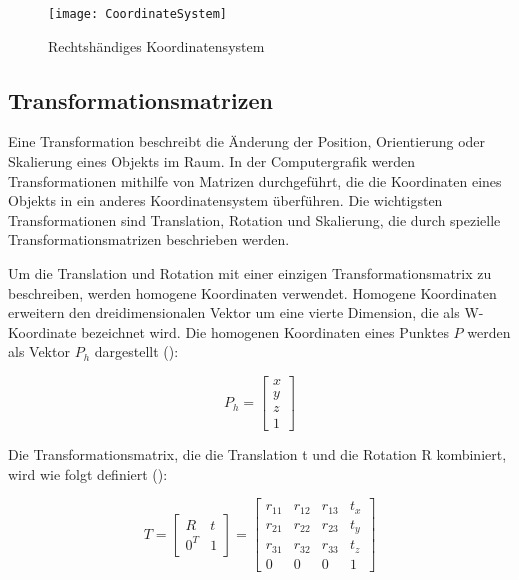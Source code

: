 \begin{figure}
    \centering
    \texttt{[image: CoordinateSystem]}
    \caption{Rechtshändiges Koordinatensystem \cite{appledevdoc}\label{fig:Koordinatensystem}}\par
\end{figure}

\subsection{Transformationsmatrizen}

Eine Transformation beschreibt die Änderung der Position, Orientierung oder Skalierung eines Objekts im Raum. In der Computergrafik werden Transformationen mithilfe von Matrizen durchgeführt, die die Koordinaten eines Objekts in ein anderes Koordinatensystem überführen. Die wichtigsten Transformationen sind Translation, Rotation und Skalierung, die durch spezielle Transformationsmatrizen beschrieben werden. \cite{doerner2022virtual, gao2021vSLAM, pezzi2021matrices}

Um die Translation und Rotation mit einer einzigen Transformationsmatrix zu beschreiben, werden homogene Koordinaten verwendet. Homogene Koordinaten erweitern den dreidimensionalen Vektor um eine vierte Dimension, die als W-Koordinate bezeichnet wird. Die homogenen Koordinaten eines Punktes \(P\) werden als Vektor \(P_h\) dargestellt (\cite{doerner2022virtual, gao2021vSLAM, freescale2010math3d}):

\begin{equation}
P_h = \begin{bmatrix} x \\ y \\ z \\ 1 \end{bmatrix}
\end{equation}

Die Transformationsmatrix, die die Translation t und die Rotation R kombiniert, wird wie folgt definiert (\cite{doerner2022virtual, gao2021vSLAM, freescale2010math3d}):

\begin{equation}
T = \begin{bmatrix} R & t \\ 0^T & 1 \end{bmatrix} = 
\begin{bmatrix} 
    r_{11} & r_{12} & r_{13} & t_x \\ 
    r_{21} & r_{22} & r_{23} & t_y \\ 
    r_{31} & r_{32} & r_{33} & t_z \\ 
    0 & 0 & 0 & 1 
\end{bmatrix}
\end{equation}

